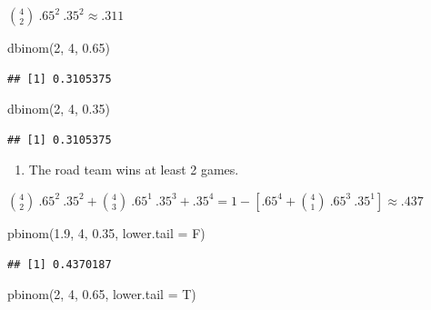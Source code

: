 \documentclass[
  11pt,
]{book}
\newenvironment{Shaded}{\begin{snugshade}}{\end{snugshade}}
\newcommand{\AttributeTok}[1]{\textcolor[rgb]{0.77,0.63,0.00}{#1}}
\newcommand{\DecValTok}[1]{\textcolor[rgb]{0.00,0.00,0.81}{#1}}
\newcommand{\FloatTok}[1]{\textcolor[rgb]{0.00,0.00,0.81}{#1}}
\newcommand{\FunctionTok}[1]{\textcolor[rgb]{0.00,0.00,0.00}{#1}}
\newcommand{\NormalTok}[1]{#1}
\providecommand{\tightlist}{%
  \setlength{\itemsep}{0pt}\setlength{\parskip}{0pt}}
\theoremstyle{definition}
\theoremstyle{definition}
\theoremstyle{definition}
\theoremstyle{definition}
\theoremstyle{remark}
\begin{document}
\(\binom{4}{2}\ .65^2\ .35^2 \approx .311\)

\begin{Shaded}
\begin{Highlighting}[]
\FunctionTok{dbinom}\NormalTok{(}\DecValTok{2}\NormalTok{, }\DecValTok{4}\NormalTok{, }\FloatTok{0.65}\NormalTok{)}
\end{Highlighting}
\end{Shaded}

\begin{verbatim}
## [1] 0.3105375
\end{verbatim}

\begin{Shaded}
\begin{Highlighting}[]
\FunctionTok{dbinom}\NormalTok{(}\DecValTok{2}\NormalTok{, }\DecValTok{4}\NormalTok{, }\FloatTok{0.35}\NormalTok{)}
\end{Highlighting}
\end{Shaded}

\begin{verbatim}
## [1] 0.3105375
\end{verbatim}

\begin{enumerate}
\def\labelenumi{(\alph{enumi})}
\setcounter{enumi}{2}
\tightlist
\item
  The road team wins at least 2 games.
\end{enumerate}

\(\binom{4}{2}\ .65^2\ .35^2 + \binom{4}{3}\ .65^1\ .35^3 + .35^4 = 1 - [.65^4 + \binom{4}{1}\ .65^3\ .35^1] \approx .437\)

\begin{Shaded}
\begin{Highlighting}[]
\FunctionTok{pbinom}\NormalTok{(}\FloatTok{1.9}\NormalTok{, }\DecValTok{4}\NormalTok{, }\FloatTok{0.35}\NormalTok{, }\AttributeTok{lower.tail =}\NormalTok{ F)}
\end{Highlighting}
\end{Shaded}

\begin{verbatim}
## [1] 0.4370187
\end{verbatim}

\begin{Shaded}
\begin{Highlighting}[]
\FunctionTok{pbinom}\NormalTok{(}\DecValTok{2}\NormalTok{, }\DecValTok{4}\NormalTok{, }\FloatTok{0.65}\NormalTok{, }\AttributeTok{lower.tail =}\NormalTok{ T)}
\end{Highlighting}
\end{Shaded}
\end{document}
